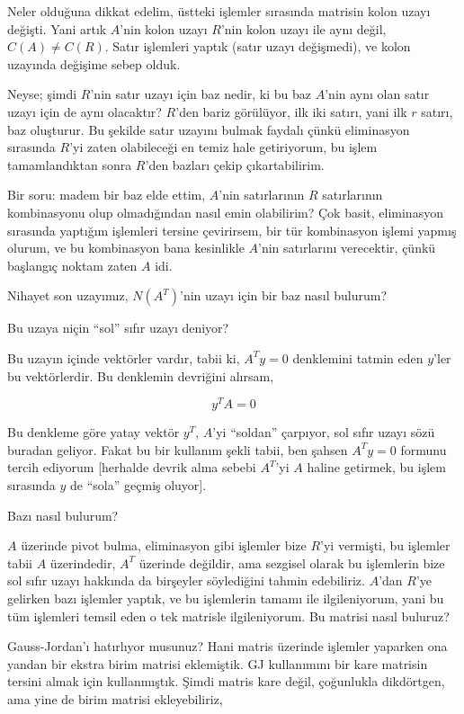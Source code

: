 \documentclass[12pt,fleqn]{article}\usepackage{../../common}
\begin{document}
Neler olduğuna dikkat edelim, üstteki işlemler sırasında matrisin kolon
uzayı değişti. Yani artık $A$'nin kolon uzayı $R$'nin kolon uzayı ile aynı
değil, $C(A) \ne C(R)$. Satır işlemleri yaptık (satır uzayı değişmedi), ve
kolon uzayında değişime sebep olduk. 

Neyse; şimdi $R$'nin satır uzayı için baz nedir, ki bu baz $A$'nin aynı
olan satır uzayı için de aynı olacaktır? $R$'den bariz görülüyor, ilk iki
satırı, yani ilk $r$ satırı, baz oluşturur. Bu şekilde satır uzayını bulmak
faydalı çünkü eliminasyon sırasında $R$'yi zaten olabileceği en temiz hale
getiriyorum, bu işlem tamamlandıktan sonra $R$'den bazları çekip
çıkartabilirim. 

Bir soru: madem bir baz elde ettim, $A$'nin satırlarının $R$ satırlarının
kombinasyonu olup olmadığından nasıl emin olabilirim? Çok basit,
eliminasyon sırasında yaptığım işlemleri tersine çevirirsem, bir tür
kombinasyon işlemi yapmış olurum, ve bu kombinasyon bana kesinlikle $A$'nin
satırlarını verecektir, çünkü başlangıç noktam zaten $A$ idi. 

Nihayet son uzayımız, $N(A^T)$'nin uzayı için bir baz nasıl bulurum?

Bu uzaya niçin ``sol'' sıfır uzayı deniyor? 

Bu uzayın içinde vektörler vardır, tabii ki, $A^Ty = 0$ denklemini tatmin
eden $y$'ler bu vektörlerdir. Bu denklemin devriğini alırsam,

$$ y^TA = 0 $$

Bu denkleme göre yatay vektör $y^T$, $A$'yi ``soldan'' çarpıyor, 
sol sıfır uzayı sözü buradan geliyor. Fakat bu bir kullanım şekli tabii,
ben şahsen $A^Ty=0$ formunu tercih ediyorum [herhalde devrik alma sebebi
$A^T$'yi $A$ haline getirmek, bu işlem sırasında $y$ de ``sola'' geçmiş
oluyor]. 

Bazı nasıl bulurum? 

$A$ üzerinde pivot bulma, eliminasyon gibi işlemler bize $R$'yi vermişti,
bu işlemler tabii $A$ üzerindedir, $A^T$ üzerinde değildir, ama sezgisel
olarak bu işlemlerin bize sol sıfır uzayı hakkında da birşeyler söylediğini
tahmin edebiliriz. $A$'dan $R$'ye gelirken bazı işlemler yaptık, ve bu
işlemlerin tamamı ile ilgileniyorum, yani bu tüm işlemleri temsil eden o
tek matrisle ilgileniyorum. Bu matrisi nasıl buluruz? 

Gauss-Jordan'ı hatırlıyor musunuz? Hani matris üzerinde işlemler yaparken
ona yandan bir ekstra birim matrisi eklemiştik. GJ kullanımını bir kare
matrisin tersini almak için kullanmıştık. Şimdi matris kare değil,
çoğunlukla dikdörtgen, ama yine de birim matrisi ekleyebiliriz, 
\end{document}
